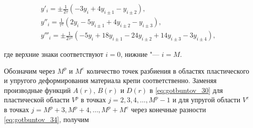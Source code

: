\begin{equation}

\begin{array}{l}

\displaystyle 

y'_i=\pm\frac{1}{2\tau}(-3y_i+4y_{i\pm1}-y_{i\pm2}),\\[2mm]

\displaystyle 

y''_i=\frac{1}{\tau^2}(2y_i-5y_{i\pm1}+4y_{i\pm2}-y_{i\pm3}),

\\[2mm]

\displaystyle 

y'''_i=\pm\frac{1}{2\tau^3}(-5y_i+18y_{i\pm1}-24y_{i\pm2}+14y_{i\pm3}-3y_{i\pm4}),  

\end{array}

\label{eq:gotbuntov_36} 

\end{equation}

где верхние знаки соответствуют $i=0$, нижние "--- $i=M$.



Обозначим через $M^p$ и $M^e$ количество точек разбиения в областях пластического и упругого деформирования материала крепи соответственно. Заменяя производные функций $A(r)$, $B(r)$ и $D(r)$ в \eqref{eq:gotbuntov_30} для пластической области $V^p$ в точках $j=2, 3, 4, \ldots, M^p-1$ и для упругой области $V^e$ в точках ${j=M^p+3}, M^p+4,\ldots, M^p+M^e$ через конечные разности \eqref{eq:gotbuntov_34}, получим

